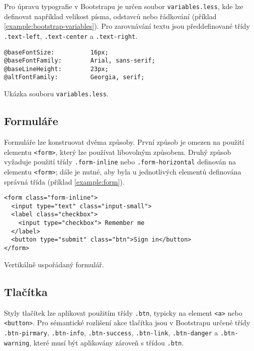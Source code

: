 Pro úpravu typografie v Bootstrapu je určen soubor \texttt{variables.less}, kde lze definovat například velikost písma, odstavců nebo řádkování (příklad \ref{example:bootstrap-variables}). Pro zarovnávání textu jsou předdefinované třídy \texttt{.text-left}, \texttt{.text-center} a \texttt{.text-right}.

\begin{example}
    \centering
    \begin{lstlisting}
@baseFontSize:          16px;
@baseFontFamily:        Arial, sans-serif;
@baseLineHeight:        23px;
@altFontFamily:         Georgia, serif;
    \end{lstlisting}
    \caption{Ukázka souboru \texttt{variables.less}.}
    \label{example:bootstrap-variables}
\end{example}

\subsection{Formuláře}

Formuláře lze konstruovat dvěma způsoby. První způsob je omezen na použití elementu \texttt{<form>}, který lze používat libovolným způsobem. Druhý způsob vyžaduje použití třídy \texttt{.form-inline} nebo \texttt{.form-horizontal} definován na elementu \texttt{<form>}; dále je nutné, aby byla u jednotlivých elementů definována správná třída (příklad \ref{example:form}).

\begin{example}
    \centering
    \begin{lstlisting}
<form class="form-inline">
  <input type="text" class="input-small">
  <label class="checkbox">
    <input type="checkbox"> Remember me
  </label>
  <button type="submit" class="btn">Sign in</button>
</form>
    \end{lstlisting}
    \caption{Vertikálně uspořádaný formulář.}
    \label{example:form}
\end{example}

\subsection{Tlačítka}

Styly tlačítek lze aplikovat použitím třídy \texttt{.btn}, typicky na element \texttt{<a>} nebo \texttt{<button>}. Pro sémantické rozlišení akce tlačítka jsou v Bootstrapu určené třídy \texttt{.btn-pirmary}, \texttt{.btn-info}, \texttt{.btn-success}, \texttt{.btn-link}, \texttt{.btn-danger} a \texttt{.btn-warning}, které musí být aplikovány zároveň s třídou \texttt{.btn}.

